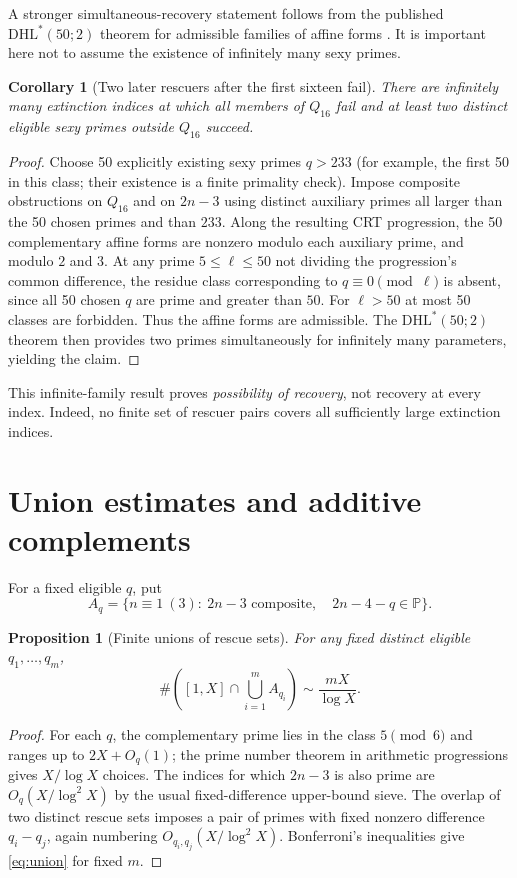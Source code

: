 \documentclass[11pt,a4paper]{article}
\newtheorem{proposition}[theorem]{Proposition}
\newtheorem{corollary}[theorem]{Corollary}
\theoremstyle{definition}
\newcommand{\PP}{\mathbb P}
\begin{document}
A stronger simultaneous-recovery statement follows from the published
$\mathrm{DHL}^{*}(50;2)$ theorem for admissible families of affine
forms \cite{Polymath2014,Ford2022}. It is important here not to
assume the existence of infinitely many sexy primes.

\begin{corollary}[Two later rescuers after the first sixteen fail]
There are infinitely many extinction indices at which all members of
$Q_{16}$ fail and at least two distinct eligible sexy primes outside
$Q_{16}$ succeed.
\end{corollary}
\begin{proof}
Choose 50 explicitly existing sexy primes $q>233$ (for example,
the first 50 in this class; their existence is a finite primality
check). Impose composite obstructions on $Q_{16}$ and on $2n-3$
using distinct auxiliary primes all larger than the 50 chosen
primes and than $233$. Along the resulting CRT progression, the
50 complementary affine forms are nonzero modulo each auxiliary
prime, and modulo $2$ and $3$. At any prime $5\le\ell\le50$ not
dividing the progression's common difference, the residue class
corresponding to $q\equiv0\pmod\ell$ is absent, since all 50
chosen $q$ are prime and greater than $50$. For $\ell>50$ at most
50 classes are forbidden. Thus the affine forms are admissible.
The $\mathrm{DHL}^{*}(50;2)$ theorem then provides two primes
simultaneously for infinitely many parameters, yielding the claim.
\end{proof}

This infinite-family result proves \emph{possibility of recovery}, not
recovery at every index. Indeed, no finite set of rescuer pairs covers
all sufficiently large extinction indices.

\section{Union estimates and additive complements}

For a fixed eligible $q$, put
\[
 A_q=\{n\equiv1\ (3):\ 2n-3\text{ composite},\quad
                       2n-4-q\in\PP\}.
\]
\begin{proposition}[Finite unions of rescue sets]\label{prop:union}
For any fixed distinct eligible $q_1,\ldots,q_m$,
\begin{equation}\label{eq:union}
 \#\left([1,X]\cap\bigcup_{i=1}^m A_{q_i}\right)
 \sim \frac{mX}{\log X}.
\end{equation}
\end{proposition}
\begin{proof}
For each $q$, the complementary prime lies in the class
$5\pmod6$ and ranges up to $2X+O_q(1)$; the prime number theorem
in arithmetic progressions gives $X/\log X$ choices.
The indices for which $2n-3$ is also prime are
$O_q(X/\log^2 X)$ by the usual fixed-difference upper-bound sieve.
The overlap of two distinct rescue sets imposes a pair of primes
with fixed nonzero difference $q_i-q_j$, again numbering
$O_{q_i,q_j}(X/\log^2 X)$. Bonferroni's inequalities give
\eqref{eq:union} for fixed $m$.
\end{proof}
\end{document}
